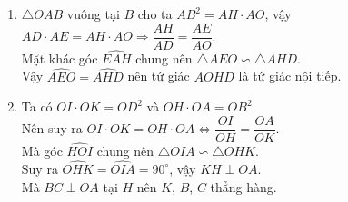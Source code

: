 \begin{ex}
{\begin{enumerate}
	Vậy $\widehat{ABD}=\widehat{BEA}$, mà góc $\widehat{BAD}$ chung nên $\triangle ABD\backsim\triangle AEB$.\\
	$\Rightarrow\dfrac{AB}{AE}=\dfrac{AD}{AB}\Leftrightarrow AB^2=AD\cdot AE$.
	\item $\triangle OAB$ vuông tại $B$ cho ta $AB^2=AH\cdot AO$, vậy $AD\cdot AE=AH\cdot AO\Rightarrow\dfrac{AH}{AD}=\dfrac{AE}{AO}$.\\
	Mặt khác góc $\widehat{EAH}$ chung nên $\triangle AEO\backsim\triangle AHD$.\\
	Vậy $\widehat{AEO}=\widehat{AHD}$ nên tứ giác $AOHD$ là tứ giác nội tiếp.
	\item Ta có $OI\cdot OK=OD^2$ và $OH\cdot OA=OB^2$.\\
	Nên suy ra $OI\cdot OK=OH\cdot OA\Leftrightarrow\dfrac{OI}{OH}=\dfrac{OA}{OK}$.\\
	Mà góc $\widehat{HOI}$ chung nên $\triangle  OIA\backsim\triangle OHK$.\\
	Suy ra $\widehat{OHK}=\widehat{OIA}=90^\circ$, vậy $KH\perp OA$.\\
	Mà $BC\perp OA$ tại $H$ nên $K$, $B$, $C$ thẳng hàng.	
\end{enumerate}}
\end{ex}
